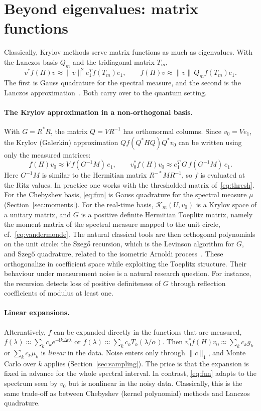 \documentclass[11pt,a4paper]{article}
\newcommand{\K}{\mathcal{K}}
\begin{document}
\section{Beyond eigenvalues: matrix functions}\label{sec:fun}

Classically, Krylov methods serve matrix functions as much as
eigenvalues. With the Lanczos basis $Q_m$ and the tridiagonal matrix $T_m$,
\[
  v^*f(H)v\approx\|v\|^2e_1^Tf(T_m)e_1,\qquad f(H)v\approx\|v\|\,Q_mf(T_m)e_1 .
\]
The first is Gauss quadrature for the spectral measure, and the second is
the Lanczos approximation~\cite{GM10}. Both carry over to the quantum
setting.

\paragraph{The Krylov approximation in a non-orthogonal basis.} With
$G=R^*R$, the matrix $Q=VR^{-1}$ has orthonormal columns. Since $v_0=Ve_1$,
the Krylov (Galerkin) approximation $Qf(Q^*HQ)Q^*v_0$ can be written using
only the measured matrices:
\begin{equation}\label{eq:fun}
  f(H)v_0\approx V\,f(G^{-1}M)\,e_1,\qquad
  v_0^*f(H)v_0\approx e_1^T\,G\,f(G^{-1}M)\,e_1 .
\end{equation}
Here $G^{-1}M$ is similar to the Hermitian matrix $R^{-*}MR^{-1}$, so $f$ is
evaluated at the Ritz values. In practice one works with the
thresholded matrix of~\eqref{eq:thresh}. For the Chebyshev basis,
\eqref{eq:fun} is Gauss quadrature for the spectral measure $\mu$
(Section~\ref{sec:moments}). For the real-time basis, $\K_m(U,v_0)$ is a
Krylov space of a unitary matrix, and $G$ is a positive definite
Hermitian Toeplitz matrix, namely the moment matrix of the spectral
measure mapped to the unit circle, cf.~\eqref{eq:vandermonde}. The
natural classical tools are then orthogonal polynomials on the unit
circle: the Szeg\H{o} recursion, which is the Levinson algorithm
for $G$, and Szeg\H{o} quadrature, related to the isometric Arnoldi
process~\cite{Gragg93}. These orthogonalize in coefficient space while
exploiting the Toeplitz structure. Their behaviour under measurement
noise is a natural research question. For instance, the recursion
detects loss of positive definiteness of $G$ through reflection
coefficients of modulus at least one.

\paragraph{Linear expansions.} Alternatively, $f$ can be expanded
directly in the functions that are measured,
$f(\lambda)\approx\sum_kc_ke^{-\mathrm{i}k\Delta t\lambda}$ or
$f(\lambda)\approx\sum_kc_kT_k(\lambda/\alpha)$. Then
$v_0^*f(H)v_0\approx\sum_kc_kg_k$ or $\sum_kc_k\mu_k$ is \emph{linear} in the
data. Noise enters only through $\|c\|_1$, and Monte Carlo over $k$
applies (Section~\ref{sec:sampling}). The price is that the expansion is
fixed in advance for the whole spectral interval. In contrast,
\eqref{eq:fun} adapts to the spectrum seen by $v_0$ but is nonlinear in
the noisy data. Classically, this is the same trade-off as between
Chebyshev (kernel polynomial) methods and Lanczos quadrature.
\end{document}
